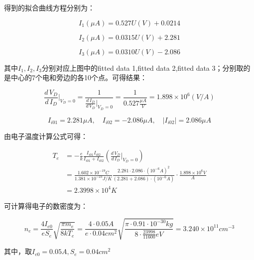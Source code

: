 \documentclass[a4paper,UTF8]{ctexart}
\begin{document}
得到的拟合曲线方程分别为：

\begin{equation}
    I_1(\mu A) = 0.527 U(V) + 0.0214   
\end{equation}

\begin{equation}
    I_2(\mu A) = 0.0315 U(V) + 2.281
\end{equation}

\begin{equation}
    I_3(\mu A) = 0.0310 U(V) - 2.086
\end{equation}

其中$I_1,I_2,I_3$分别对应上图中的fitted data 1,fitted data 2,fitted data 3；分别取的是中心的7个电和旁边的各10个点。可得结果：

\begin{equation}
    \frac{d\,V_D}{d\,I_D}\bigg|_{V_D = 0} = \frac{1}{\frac{d\,I_D}{d\,V_D} \bigg|_{V_D = 0}} = \frac{1}{0.527\frac{\mu A}{V}} = 1.898 \times 10^6 (V/A)
\end{equation}

\begin{equation}
    I_{i01} = 2.281 \mu A, \quad I_{i02} = -2.086 \mu A, \quad \left\lvert I_{i02}\right\rvert = 2.086 \mu A
\end{equation}

由电子温度计算公式可得：

\begin{equation}
    \begin{aligned}
        T_e &= -\frac{e}{k} \frac{I_{i01}I_{i02}}{I_{i01}+I_{i02}} (\frac{d\,V_D}{d\,I_D}\bigg|_{V_D = 0}) \\ 
        &= \frac{1.602 \times 10^{-19}C}{1.381\times 10^{-23} J/K} \frac{2.281 \cdot 2.086 \cdot (10^{-6}A)^2}{(2.281+2.086) \cdot(10^{-6}A)} \cdot \frac{1.898 \times 10^6V}{A} \\
        &= 2.3998 \times 10^4 K
    \end{aligned}
\end{equation}

可计算得电子的数密度为：

\begin{equation}
    n_e = \frac{4I_{e0}}{eS_e} \sqrt{\frac{\pi m_e}{8k T_e}} = \frac{4 \cdot 0.05A}{e \cdot 0.04cm^2} \sqrt{\frac{\pi \cdot 0.91 \cdot 10^{-30}kg}{8\cdot\frac{23998}{11600}eV}} = 3.240 \times 10^{11} cm^{-3}
\end{equation}

其中，取$I_{e0} = 0.05A,S_e = 0.04cm^2$
\end{document}
